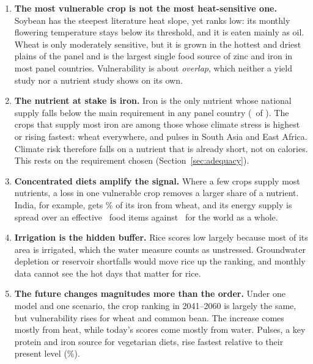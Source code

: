 \begin{enumerate}
\item \textbf{The most vulnerable crop is not the most heat-sensitive one.} Soybean has the steepest literature heat
slope, yet ranks low: its monthly flowering temperature stays below its threshold, and it is eaten mainly as oil.
Wheat is only moderately sensitive, but it is grown in the hottest and driest plains of the panel and is the
largest single food source of zinc and iron in most panel countries. Vulnerability is about \emph{overlap}, which
neither a yield study nor a nutrient study shows on its own.
\item \textbf{The nutrient at stake is iron.} Iron is the only nutrient whose national supply falls below the main
requirement in any panel country (\nIronShort\ of \nAdqCountries). The crops that supply most iron are among those
whose climate stress is highest or rising fastest: wheat everywhere, and pulses in South Asia and East Africa.
Climate risk therefore falls on a nutrient that is already short, not on calories. This rests on the requirement
chosen (Section~\ref{sec:adequacy}).
\item \textbf{Concentrated diets amplify the signal.} Where a few crops supply most nutrients, a loss in one
vulnerable crop removes a larger share of a nutrient. India, for example, gets \divIndIronTopShare\% of its iron from
wheat, and its energy supply is spread over an effective \divIndKcal\ food items against \divWorldKcal\ for the
world as a whole.
\item \textbf{Irrigation is the hidden buffer.} Rice scores low largely because most of its area is irrigated,
which the water measure counts as unstressed. Groundwater depletion or reservoir shortfalls would move rice up the
ranking, and monthly data cannot see the hot days that matter for rice.
\item \textbf{The future changes magnitudes more than the order.} Under one model and one scenario, the crop
ranking in 2041--2060 is largely the same, but vulnerability rises for wheat and common bean. The increase comes
mostly from heat, while today's scores come mostly from water. Pulses, a key protein and iron source for
vegetarian diets, rise fastest relative to their present level (\grpPulsePct\%).
\end{enumerate}

